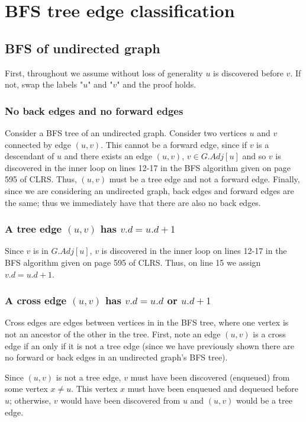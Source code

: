 \documentclass[paper=a4, fontsize=11pt]{scrartcl} %
\numberwithin{equation}{section} %
\numberwithin{figure}{section} %
\numberwithin{table}{section} %
\begin{document}
\section{BFS tree edge classification}

\subsection{BFS of undirected graph}

First, throughout we assume without loss of generality $u$ is discovered before $v$. If not, swap the labels "$u$" and "$v$" and the proof holds.

\subsubsection{No back edges and no forward edges}

Consider a BFS tree of an undirected graph. Consider two vertices $u$ and $v$ connected by edge $(u,v)$. This cannot be a forward edge, since if $v$ is a descendant of $u$ and there exists an edge $(u,v)$, $v \in G.Adj[u]$ and so $v$ is discovered in the inner loop on lines 12-17 in the BFS algorithm given on page 595 of CLRS. Thus, $(u,v)$ must be a tree edge and not a forward edge. Finally, since we are considering an undirected graph, back edges and forward edges are the same; thus we immediately have that there are also no back edges.

\subsubsection{A tree edge $(u,v)$ has $v.d = u.d + 1$}

Since $v$ is in $G.Adj[u]$, $v$ is discovered in the inner loop on lines 12-17 in the BFS algorithm given on page 595 of CLRS. Thus, on line 15 we assign $v.d = u.d + 1$.

\subsubsection{A cross edge $(u,v)$ has $v.d = u.d$ or $u.d + 1$}

Cross edges are edges between vertices in in the BFS tree, where one vertex is not an ancestor of the other in the tree. First, note an edge $(u,v)$ is a cross edge if an only if it is not a tree edge (since we have previously shown there are no forward or back edges in an undirected graph's BFS tree).

Since $(u,v)$ is not a tree edge, $v$ must have been discovered (enqueued) from some vertex $x \ne u$. This vertex $x$ must have been enqueued and dequeued before $u$; otherwise, $v$ would have been discovered from $u$ and $(u,v)$ would be a tree edge.
\end{document}
